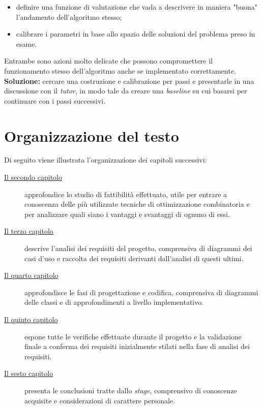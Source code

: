 \begin{enumerate}
    \begin{itemize}
        \item definire una funzione di valutazione che vada a descrivere in maniera "buona" l'andamento dell'algoritmo stesso;
        \item calibrare i parametri in base allo spazio delle soluzioni del problema preso in esame.
    \end{itemize}
    Entrambe sono azioni molto delicate che possono compromettere il funzionamento stesso dell'algoritmo anche
    se implementato correttamente.\\[0.2cm]
    \textbf{Soluzione:} cercare una costruzione e calibrazione per passi e presentarle in una discussione con il \textit{tutor},
    in modo tale da creare una \textit{baseline} su cui basarsi per continuare con i passi successivi.


\end{enumerate}

\noindent
\section{Organizzazione del testo}
\noindent Di seguito viene illustrata l'organizzazione dei capitoli successivi:
\begin{description}
    \item[{\hyperref[cap:studio-fattibilita]{Il secondo capitolo}}] 
    approfondice lo studio di fattibilità effettuato, utile per entrare a conoscenza
    delle più utilizzate tecniche di ottimizzazione combinatoria e per analizzare
    quali siano i vantaggi e svantaggi di ognuno di essi.
    
    \item[{\hyperref[cap:analisi-requisiti]{Il terzo capitolo}}]
    descrive l'analisi dei requisiti del progetto, comprensiva di diagrammi dei
    casi d'uso e raccolta dei requisiti derivanti dall'analisi di questi ultimi.
    
    \item[{\hyperref[cap:progettazione-codifica]{Il quarto capitolo}}]
    approfondisce le fasi di progettazione e codifica, comprensiva di diagrammi delle classi
    e di approfondimenti a livello implementativo.
    
    \item[{\hyperref[cap:verifica-validazione]{Il quinto capitolo}}]
    espone tutte le verifiche effettuate durante il progetto e la validazione
    finale a conferma dei requisiti inizialmente stilati nella fase di
    analisi dei requisiti.
    
    \item[{\hyperref[cap:conclusioni]{Il sesto capitolo}}]
    presenta le conclusioni tratte dallo \textit{stage}, comprensivo di conoscenze
    acquisite e considerazioni di carattere personale.
\end{description}


